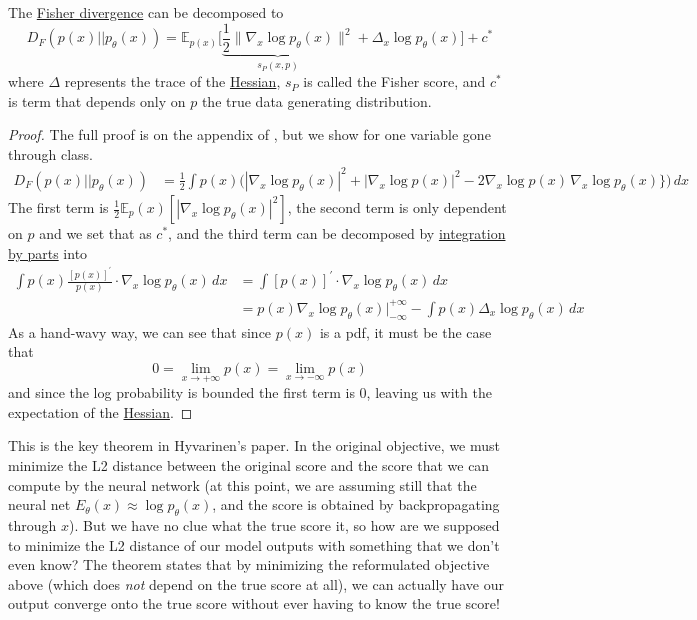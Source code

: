 \documentclass{article}
\begin{document}
    \begin{theorem}
      \label{thm:no-need-for-true-score-to-optimize-fisher}
      The \hyperref[def:fisher-divergence]{Fisher divergence} can be decomposed to 
      \begin{equation}
        D_F (p(x) || p_\theta (x)) = \mathbb{E}_{p(x)} \bigg[ \underbrace{\frac{1}{2} \| \nabla_x \log p_\theta (x)}_{s_P (x, p)} \|^2 + \Delta_x \log p_\theta (x) \bigg] + c^\ast
      \end{equation}
      where $\Delta$ represents the trace of the \hyperref[mv-def:hessian]{Hessian}, $s_P$ is called the Fisher score, and $c^\ast$ is  term that depends only on $p$ the true data generating distribution. 
    \end{theorem}
    \begin{proof}
      The full proof is on the appendix of \cite{orig_score}, but we show for one variable gone through class. 
      \begin{align}
        D_F (p(x) || p_\theta (x)) & = \frac{1}{2} \int p(x) \big( |\nabla_x \log p_\theta (x)|^2 + | \nabla_x \log p(x) |^2 - 2 \nabla_x \log p(x) \, \nabla_x \log p_\theta (x)\} \big) \,dx
      \end{align}
      The first term is $\frac{1}{2} \mathbb{E}_p(x) [|\nabla_x \log p_\theta (x)|^2]$, the second term is only dependent on $p$ and we set that as $c^\ast$, and the third term can be decomposed by \hyperref[real-thm:integration-by-parts]{integration by parts} into  
      \begin{align}
        \int p(x) \frac{[p(x)]^\prime}{p(x)} \cdot \nabla_x \log p_\theta (x) \,dx & = \int [p(x)]^\prime \cdot \nabla_x \log p_\theta (x) \,dx \\ 
                                           & = p(x) \nabla_x \log p_\theta (x) \Big|_{-\infty}^{+\infty} - \int p(x) \Delta_x \log p_\theta (x) \,dx 
      \end{align}
      As a hand-wavy way, we can see that since $p(x)$ is a pdf, it must be the case that 
      \begin{equation}
        0 = \lim_{x \rightarrow +\infty} p(x) = \lim_{x \rightarrow -\infty} p(x) 
      \end{equation}
      and since the log probability is bounded the first term is $0$, leaving us with the expectation of the \hyperref[mv-def:hessian]{Hessian}. 
    \end{proof} 

    This is the key theorem in Hyvarinen's paper. In the original objective, we must minimize the L2 distance between the original score and the score that we can compute by the neural network (at this point, we are assuming still that the neural net $E_\theta (x) \approx \log p_\theta (x)$, and the score is obtained by backpropagating through $x$). But we have no clue what the true score it, so how are we supposed to minimize the L2 distance of our model outputs with something that we don't even know? The theorem states that by minimizing the reformulated objective above (which does \textit{not} depend on the true score at all), we can actually have our output converge onto the true score without ever having to know the true score! 
\end{document}
